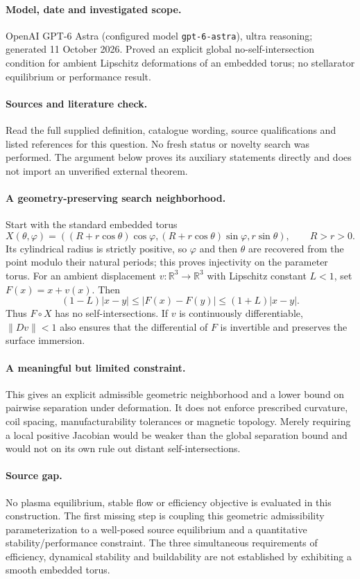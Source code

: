 \documentclass[11pt]{article}
\begin{document}
\paragraph{Model, date and investigated scope.}
OpenAI GPT-6 Astra (configured model \texttt{gpt-6-astra}), ultra reasoning; generated 11 October 2026. Proved an explicit global no-self-intersection condition for ambient Lipschitz deformations of an embedded torus; no stellarator equilibrium or performance result.

\paragraph{Sources and literature check.}
Read the full supplied definition, catalogue wording, source qualifications and listed references for this question. No fresh status or novelty search was performed. The argument below proves its auxiliary statements directly and does not import an unverified external theorem.

\paragraph{A geometry-preserving search neighborhood.} Start with the standard embedded torus
\[
 X(\theta,\varphi)=((R+r\cos\theta)\cos\varphi,
 (R+r\cos\theta)\sin\varphi,r\sin\theta),\qquad R>r>0.
\]
Its cylindrical radius is strictly positive, so \(\varphi\) and then \(\theta\) are recovered from the point modulo their natural periods; this proves injectivity on the parameter torus. For an ambient displacement \(v:\mathbb R^3\to\mathbb R^3\) with Lipschitz constant \(L<1\), set \(F(x)=x+v(x)\). Then
\[
 (1-L)|x-y|\leq|F(x)-F(y)|\leq(1+L)|x-y|.
\]
Thus \(F\circ X\) has no self-intersections. If \(v\) is continuously differentiable, \(\|Dv\|<1\) also ensures that the differential of \(F\) is invertible and preserves the surface immersion.
\paragraph{A meaningful but limited constraint.} This gives an explicit admissible geometric neighborhood and a lower bound on pairwise separation under deformation. It does not enforce prescribed curvature, coil spacing, manufacturability tolerances or magnetic topology. Merely requiring a local positive Jacobian would be weaker than the global separation bound and would not on its own rule out distant self-intersections.
\paragraph{Source gap.} No plasma equilibrium, stable flow or efficiency objective is evaluated in this construction. The first missing step is coupling this geometric admissibility parameterization to a well-posed source equilibrium and a quantitative stability/performance constraint. The three simultaneous requirements of efficiency, dynamical stability and buildability are not established by exhibiting a smooth embedded torus.
\end{document}

